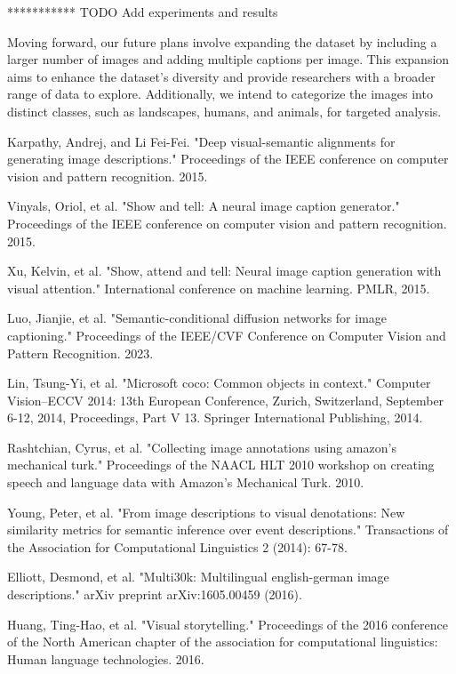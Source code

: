 \documentclass[runningheads]{llncs}
\begin{document}
*********** TODO Add experiments and results

Moving forward, our future plans involve expanding the dataset by including a larger number of images and adding multiple captions per image. This expansion aims to enhance the dataset's diversity and provide researchers with a broader range of data to explore. Additionally, we intend to categorize the images into distinct classes, such as landscapes, humans, and animals, for targeted analysis.


\begin{thebibliography}{8}
Karpathy, Andrej, and Li Fei-Fei. "Deep visual-semantic alignments for generating image descriptions." Proceedings of the IEEE conference on computer vision and pattern recognition. 2015.

Vinyals, Oriol, et al. "Show and tell: A neural image caption generator." Proceedings of the IEEE conference on computer vision and pattern recognition. 2015.

Xu, Kelvin, et al. "Show, attend and tell: Neural image caption generation with visual attention." International conference on machine learning. PMLR, 2015.

Luo, Jianjie, et al. "Semantic-conditional diffusion networks for image captioning." Proceedings of the IEEE/CVF Conference on Computer Vision and Pattern Recognition. 2023.

Lin, Tsung-Yi, et al. "Microsoft coco: Common objects in context." Computer Vision–ECCV 2014: 13th European Conference, Zurich, Switzerland, September 6-12, 2014, Proceedings, Part V 13. Springer International Publishing, 2014.

Rashtchian, Cyrus, et al. "Collecting image annotations using amazon’s mechanical turk." Proceedings of the NAACL HLT 2010 workshop on creating speech and language data with Amazon’s Mechanical Turk. 2010.

Young, Peter, et al. "From image descriptions to visual denotations: New similarity metrics for semantic inference over event descriptions." Transactions of the Association for Computational Linguistics 2 (2014): 67-78.

Elliott, Desmond, et al. "Multi30k: Multilingual english-german image descriptions." arXiv preprint arXiv:1605.00459 (2016).

Huang, Ting-Hao, et al. "Visual storytelling." Proceedings of the 2016 conference of the North American chapter of the association for computational linguistics: Human language technologies. 2016.


\end{thebibliography}
\end{document}
